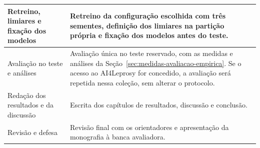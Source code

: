 \begin{longtable}{|>{\raggedright\arraybackslash}p{4.2cm}|>{\raggedright\arraybackslash}p{10.8cm}|}
	Retreino, limiares e fixação dos modelos & Retreino da configuração escolhida
	com três sementes, definição dos limiares na partição própria e fixação dos
	modelos antes do teste.                                                                           \\
	\hline
	Avaliação no teste e análises            & Avaliação única no teste reservado, com as
	medidas e análises da Seção~\ref{sec:medidas-avaliacao-empirica}. Se o acesso
	ao AI4Leprosy for concedido, a avaliação será repetida nessa coleção, sem
	alterar o protocolo.                                                                              \\
	\hline
	Redação dos resultados e da discussão    & Escrita dos capítulos de resultados,
	discussão e conclusão.                                                                            \\
	\hline
	Revisão e defesa                         & Revisão final com os orientadores e apresentação da
	monografia à banca avaliadora.                                                                    \\
\end{longtable}
\endgroup
{}
